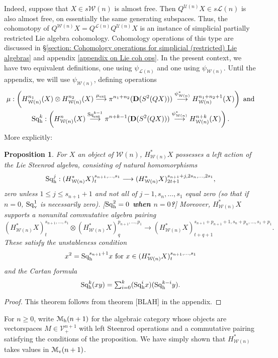 \documentclass[11pt]{amsart}
\theoremstyle{plain}
\newtheorem{prop}[thm]{Proposition}
\theoremstyle{definition}
\renewcommand{\to}{\longrightarrow}
\newcommand{\calW}{\mathcal{W}}
\newcommand{\calU}{\mathcal{U}}
\newcommand{\calL}{\mathcal{L}}
\newcommand{\calV}{\mathcal{V}}
\newcommand{\calMv}{\mathcal{M}_\textup{v}}
\newcommand{\calMh}{\mathcal{M}_\textup{h}}
\theoremstyle{plain}
\newcommand{\vect}[2]{\calV^{#1}_{#2}}
\newcommand{\ExtCohOp}{\textup{Sq}_\textup{ext}}
\newcommand{\ExtCohProd}{\mu_\textup{ext}}
\newcommand{\Sqh}{\mathrm{Sq}_\textup{h}}
\newcommand{\Sqv}{\mathrm{Sq}_\textup{v}}
\newcommand{\dual}{\mathbf{D}}
\begin{document}
\begin{Cohomology operations for all unstable Lie algebras}
Indeed, suppose that $X\in s\calW(n)$ is almost free. Then $Q^{\calU(n)}X\in s\calL(n)$ is also almost free, on essentially the same generating subspaces. Thus, the cohomotopy of $Q^{\calW(n)}X=Q^{\calL(n)}Q^{\calU(n)}X$ is an instance of simplicial partially restricted Lie algebra cohomology. Cohomology operations of this type are discussed in \S\ref{section: Cohomology operations for simplicial (restricted) Lie algebras} and appendix \ref{appendix on Lie coh ops}. In the present context, we have two equivalent definitions, one using $\psi_{\calL(n)}$ and one using $\psi_{\calW(n)}$. Until the appendix, we will use $\psi_{\calW(n)}$, defining operations
\begin{gather*}
\mu:\left(H_{\calW(n)}^{n_1}(X)\otimes H_{\calW(n)}^{n_2}(X)\overset{\ExtCohProd}{\to} \pi^{n_1+n_2}(\dual(S^2(QX)))\overset{\psi_{\calW(n)}^*}{\to} H_{\calW(n)}^{n_1+n_2+1}(X)\right)\textup{ and}\\
\Sqh^k:\left(H_{\calW(n)}^{n}(X)\overset{\ExtCohOp^{k-1}}{\to} \pi^{n+k-1}(\dual(S^2(QX)))\overset{\psi_{\calW(n)}^*}{\to} H_{\calW(n)}^{n+k}(X)\right).
\end{gather*}
More explicitly:
\begin{prop}
For $X$ an object of $\calW(n)$, $H^*_{\calW(n)}X$ possesses a left action of the Lie Steenrod algebra, consisting of natural homomorphisms
\[\Sqh^j:(H^*_{\calW(n)}X)_t^{s_{n+1},\ldots,s_1}\to (H^*_{\calW(n)}X)_{2t+1}^{s_{n+1}+j,2s_{n},\ldots,2s_1},\]
zero unless $1\leq j\leq s_{n+1}+1$ and not all of $j-1,s_{n},\ldots,s_1$ equal zero (so that if $n=0$, $\Sqv^1$ is necessarily zero). %
[\textbf{$\Sqh^2=0$ when $n=0$?}] Moreover, $H^*_{\calW(n)}X$ supports a nonunital commutative algebra pairing
\[(H^*_{\calW(n)}X)_t^{s_{n+1},\ldots,s_1}\otimes (H^*_{\calW(n)}X)_q^{p_{n+1},\ldots,p_1}\to (H^*_{\calW(n)}X)_{t+q+1}^{s_{n+1}+p_{n+1}+1,s_{n}+p_{n},\ldots,s_1+p_1}.\]
These satisfy the unstableness condition
\[x^2=\Sqh^{s_{n+1}+1}x\text{ for }x\in (H^*_{\calW(n)}X)_t^{s_{n+1},\ldots,s_1}\]
and the Cartan formula
\[\Sqh^k(xy)=\textstyle\sum_{i=0}^k(\Sqh^ix)(\Sqh^{k-i}y).\]
\end{prop}
\begin{proof}
This theorem follows from theorem [BLAH] in the appendix.
\end{proof}
For $n\geq0$, write $\calMh(n+1)$ for the algebraic category whose objects are vectorspaces $M\in\vect{n+1}{+}$ with left Steenrod operations and a commutative pairing satisfying the conditions of the proposition. We have simply shown that $H^*_{\calW(n)}$ takes values in $\calMv(n+1)$.


\end{Cohomology operations for all unstable Lie algebras}
\end{document}
